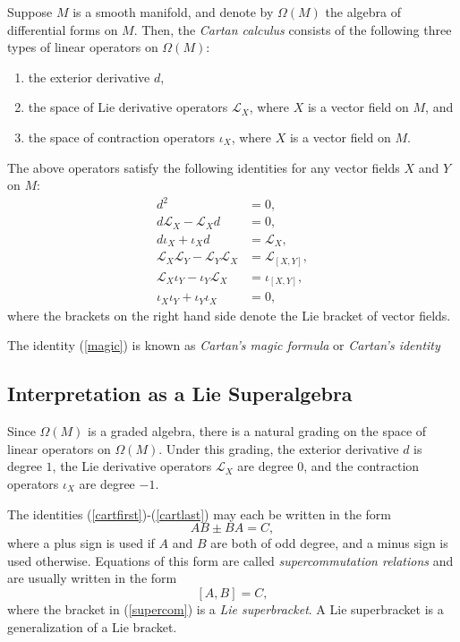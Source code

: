 \documentclass{article}
\theoremstyle{definition}
\theoremstyle{remark}
\newcommand{\lie}{\mathcal{L}}
\begin{document}
Suppose $M$ is a smooth manifold, and denote by $\Omega(M)$ the algebra of differential forms on $M$.  Then, the \emph{Cartan calculus} consists of the following three types of linear operators on $\Omega(M)$:
\begin{enumerate}
\item the exterior derivative $d$,
\item the space of Lie derivative operators $\lie_X$, where $X$ is a vector field on $M$, and
\item the space of contraction operators $\iota_X$, where $X$ is a vector field on $M$.
\end{enumerate}

The above operators satisfy the following identities for any vector fields $X$ and $Y$ on $M$:
\begin{align}
d^2 &= 0, \label{cartfirst}\\
d \lie_X - \lie_X d &= 0, \\
d \iota_X + \iota_X d &= \lie_X, \label{magic}\\
\lie_X \lie_Y - \lie_Y \lie_X &= \lie_{[X,Y]}, \\
\lie_X \iota_Y - \iota_Y \lie_X &= \iota_{[X,Y]},\\
\iota_X \iota_Y + \iota_Y \iota_X &= 0, \label{cartlast}
\end{align}
where the brackets on the right hand side denote the Lie bracket of vector fields.

The identity (\ref{magic}) is known as \emph{Cartan's magic formula} or \emph{Cartan's identity}

\subsection*{Interpretation as a Lie Superalgebra}

Since $\Omega(M)$ is a graded algebra, there is a natural grading on the space of linear operators on $\Omega(M)$.  Under this grading, the exterior derivative $d$ is degree $1$, the Lie derivative operators $\lie_X$ are degree $0$, and the contraction operators $\iota_X$ are degree $-1$.

The identities (\ref{cartfirst})-(\ref{cartlast}) may each be written in the form
\begin{equation}
AB \pm BA = C,
\end{equation}
where a plus sign is used if $A$ and $B$ are both of odd degree, and a minus sign is used otherwise.  Equations of this form are called \emph{supercommutation relations} and are usually written in the form
\begin{equation}\label{supercom}
[A,B] = C,
\end{equation}
where the bracket in (\ref{supercom}) is a \emph{Lie superbracket}.  A Lie superbracket is a generalization of a Lie bracket.
\end{document}
